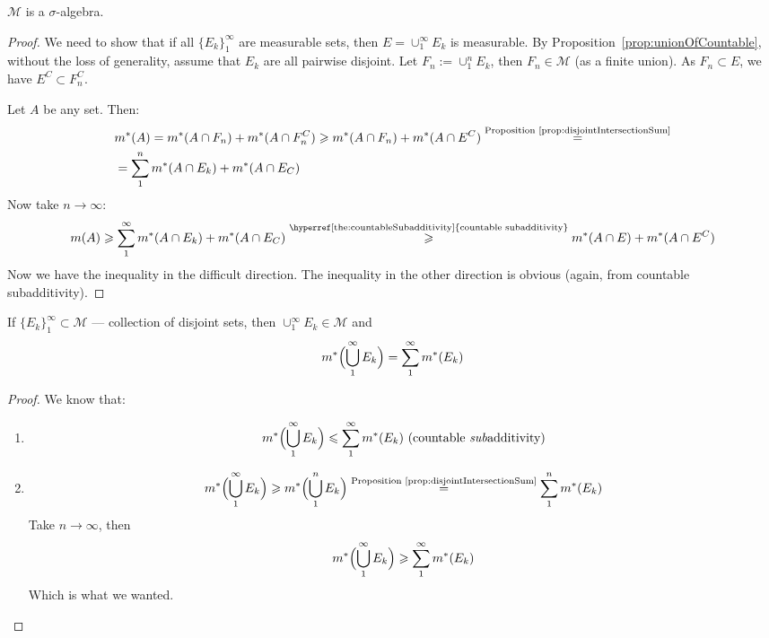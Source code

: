 \begin{theorem}
    $\mathcal{M}$ is a $\sigma$-algebra.
\end{theorem}
\begin{proof}
    We need to show that if all $\{E_k\}_1^\infty$ are measurable sets,
    then $E = \cup_1^\infty E_k$ is measurable. 
    By Proposition~\ref{prop:unionOfCountable}, without the loss of generality,
    assume that $E_k$ are all pairwise disjoint.
    Let $F_n := \cup_1^n E_k$, then $F_n \in \mathcal{M}$
    (as a finite union). As $F_n \subset E$, we have $E^C \subset F_n^C$.

    Let $A$ be any set. Then:
    \begin{align*}
        &
        m^*(A) = m^*(A \cap F_n) + m^*(A \cap F_n^C) \ge
        m^*(A \cap F_n) + m^*(A \cap E^C)
        \overset{\text{Proposition~\ref{prop:disjointIntersectionSum}}}{=}
        \\&=
        \sum_1^n m^*(A \cap E_k) + m^*(A \cap E_C)
    \end{align*}
    Now take $n \to \infty$:
    \begin{align*}
        m(A) \ge \sum_1^\infty m^*(A \cap E_k) + m^*(A \cap E_C)
        \overset{\text{\hyperref[the:countableSubadditivity]{countable subadditivity}}}{\ge}
        m^*(A \cap E) + m^*(A \cap E^C)
    \end{align*}
    Now we have the inequality in the difficult direction. The inequality in the other direction
    is obvious (again, from countable subadditivity).
\end{proof}

\begin{proposition}
    If $\{E_k\}_1^\infty \subset \mathcal{M}$ --- collection of
    disjoint sets, then  $\cup_1^\infty E_k \in \mathcal{M}$
    and
    \[ m^*\Bigl(\bigcup_1^\infty E_k\Bigr) = \sum_1^\infty m^*(E_k) \] 
\end{proposition}
\begin{proof}
    We know that:
    \begin{enumerate}
        \item {
            \[ m^*\Bigl( \bigcup_1^\infty E_k \Bigr) \le
            \sum_1^\infty m^*(E_k) \text{ (countable \textit{sub}additivity)}\]
        }
        \item {
            \[ m^*\Bigl(\bigcup_1^\infty E_k\Bigr) \ge
            m^*\Bigl( \bigcup_1^n E_k \Bigr) \overset{\text{Proposition~\ref{prop:disjointIntersectionSum}}}{=}
            \sum_1^n m^*(E_k) \]
            Take $n \to \infty$, then
            \[ m^*\Bigl( \bigcup_1^\infty E_k \Bigr) \ge 
            \sum_1^\infty m^*(E_k) \]
            Which is what we wanted.
        }
    \end{enumerate}
\end{proof}


